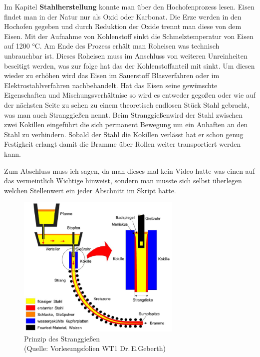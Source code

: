 \documentclass[12pt]{scrreprt}
\begin{document}
Im Kapitel \textbf{Stahlherstellung} konnte man über den Hochofenprozess lesen. Eisen findet man in der Natur nur als Oxid oder Karbonat. Die Erze werden in den Hochofen gegeben und durch Reduktion der Oxide trennt man diese von dem Eisen. Mit der Aufnahme von Kohlenstoff sinkt die Schmelztemperatur von Eisen auf 1200 °C. Am Ende des Prozess erhält man Roheisen was technisch unbrauchbar ist. 
Dieses Roheisen muss im Anschluss von weiteren Unreinheiten beseitigt werden, was zur folge hat das der Kohlenstoffanteil mit sinkt. Um diesen wieder zu erhöhen wird das Eisen im Sauerstoff Blasverfahren oder im Elektrostahlverfahren nachbehandelt.  
Hat das Eisen seine gewünschte Eigenschaften und Mischungsverhältnise so wird es entweder gegoßen oder wie auf der nächsten Seite zu sehen zu einem theoretisch endlosen Stück Stahl gebracht, was man auch Stranggießen nennt.
Beim Stranggießenwird der Stahl zwischen zwei Kokillen eingeführt die sich permanent Bewegung um ein Anhaften an den Stahl zu verhindern. Sobald der Stahl die Kokillen verlässt hat er schon genug Festigkeit erlangt damit die Bramme über Rollen weiter transportiert werden kann. \medskip

Zum Abschluss muss ich sagen, da man dieses mal kein Video hatte was einen auf das vermeintlich Wichtige hinweist, sondern man musste sich selbst überlegen welchen Stellenwert ein jeder Abschnitt im Skript hatte. 


\begin{figure}[h]
	\centering
	\includegraphics[width=0.7\textwidth]{stahl.png}
	\caption{Prinzip des Stranggießen\\(Quelle: Vorlesungsfolien WT1 Dr.\,E.Geberth)}
\end{figure}
\end{document}
